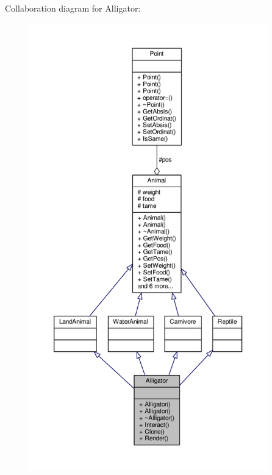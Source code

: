 Collaboration diagram for Alligator\+:
\nopagebreak
\begin{figure}[H]
\begin{center}
\leavevmode
\includegraphics[height=550pt]{classAlligator__coll__graph}
\end{center}
\end{figure}
